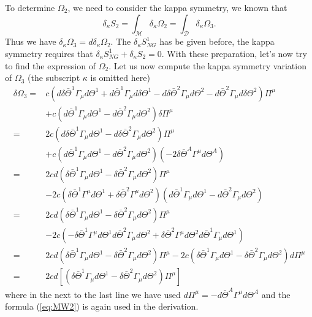 \documentclass[graybox,envcountchap,sectrefs]{svmono}
\begin{document}
To determine $\Omega_2$, we need to consider the kappa symmetry, we known that 
\begin{equation}
\delta_{\kappa}S_2=\int_{\mathcal{M}} \delta_{\kappa}\Omega_2=\int_{\mathcal{D}}\delta_{\kappa}\Omega_3.
\end{equation}
Thus we have $\delta_{\kappa}\Omega_3=d\delta_{\kappa}{\Omega_2}$.
The $\delta_{\kappa}S^1_{NG}$ has be given before, the kappa symmetry requires that $\delta_{\kappa}S_{NG}^1+\delta_{\kappa}S_2=0$. With these preparation, let's now try to find the expression of $\Omega_2$.
Let us now compute the kappa symmetry variation of $\Omega_{3}$ (the subscript $\kappa$ is omitted here)
\begin{align}
\delta \Omega_{3}=& c\left(d \delta \bar{\Theta}^{1} \Gamma_{\mu} d \Theta^{1}+d \bar{\Theta}^{1} \Gamma_{\mu} d \delta \Theta^{1}-d \delta \bar{\Theta}^{2} \Gamma_{\mu} d \Theta^{2}-d \bar{\Theta}^{2} \Gamma_{\mu} d \delta \Theta^{2}\right) \Pi^{\mu}\nonumber \\
&+c\left(d \bar{\Theta}^{1} \Gamma_{\mu} d \Theta^{1}-d \bar{\Theta}^{2} \Gamma_{\mu} d \Theta^{2}\right) \delta \Pi^{\mu}\nonumber \\
=& 2 c\left(d \delta \bar{\Theta}^{1} \Gamma_{\mu} d \Theta^{1}-d \delta \bar{\Theta}^{2} \Gamma_{\mu} d \Theta^{2}\right) \Pi^{\mu}\nonumber \\
&+c\left(d \bar{\Theta}^{1} \Gamma_{\mu} d\Theta^{1}-d \bar{\Theta}^{2} \Gamma_{\mu} d \Theta^{2}\right)\left(-2 \delta \bar{\Theta}^{A} \Gamma^{\mu} d \Theta^{A}\right) \nonumber\\
=& 2 c d\left(\delta \bar{\Theta}^{1} \Gamma_{\mu} d \Theta^{1}-\delta \bar{\Theta}^{2} \Gamma_{\mu} d \Theta^{2}\right) \Pi^{\mu}\nonumber \\
&-2 c\left(\delta \bar{\Theta}^{1} \Gamma^{\mu} d \Theta^{1}+\delta \bar{\Theta}^{2} \Gamma^{\mu} d \Theta^{2}\right)\left(d \bar{\Theta}^{1} \Gamma_{\mu} d \Theta^{1}-d \bar{\Theta}^{2} \Gamma_{\mu} d \Theta^{2}\right)\nonumber \\
=& 2 c d\left(\delta \bar{\Theta}^{1} \Gamma_{\mu} d \Theta^{1}-\delta \bar{\Theta}^{2} \Gamma_{\mu} d \Theta^{2}\right) \Pi^{\mu}\nonumber \\
&-2 c\left(-\delta \bar{\Theta}^{1} \Gamma^{\mu} d \Theta^{1} d \bar{\Theta}^{2} \Gamma_{\mu} d \Theta^{2}+\delta \bar{\Theta}^{2} \Gamma^{\mu} d \Theta^{2} d \bar{\Theta}^{1} \Gamma_{\mu} d \Theta^{1}\right)\nonumber \\
=& 2 c d\left(\delta \bar{\Theta}^{1} \Gamma_{\mu} d \Theta^{1}-\delta \bar{\Theta}^{2} \Gamma_{\mu} d \Theta^{2}\right) \Pi^{\mu}-2 c\left(\delta \bar{\Theta}^{1} \Gamma_{\mu} d \Theta^{1}-\delta \bar{\Theta}^{2} \Gamma_{\mu} d \Theta^{2}\right) d \Pi^{\mu} \nonumber\\
=& 2 c d\left[\left(\delta \bar{\Theta}^{1} \Gamma_{\mu} d \Theta^{1}-\delta \bar{\Theta}^{2} \Gamma_{\mu} d \Theta^{2}\right) \Pi^{\mu}\right]
\end{align}
where in the next to the last line we have used $d \Pi^{\mu}=-d \bar{\Theta}^{A} \Gamma^{\mu} d \Theta^{A}$ and the formula (\ref{eq:MW2}) is again used in the derivation.
\end{document}
